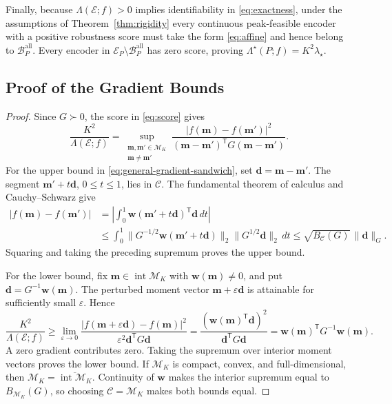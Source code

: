 \documentclass[journal,12pt,onecolumn,draftclsnofoot]{IEEEtran}
\newcommand{\enc}{\mathscr{E}}\newcommand{\dec}{\mathscr{D}}\newcommand{\R}{\mathbb R}\newcommand{\C}{\mathbb C}
\newcommand{\T}{\mathsf T}\newcommand{\suc}{\succeq}
\begin{document}
Finally, because $\Lambda(\enc;f)>0$ implies identifiability in \eqref{eq:exactness}, under the assumptions of Theorem~\ref{thm:rigidity} every continuous peak-feasible encoder with a positive robustness score must take the form \eqref{eq:affine} and hence belong to $\mathcal B_P^{\mathrm{all}}$. Every encoder in $\mathcal E_P\setminus\mathcal B_P^{\mathrm{all}}$ has zero score, proving $\Lambda^\star(P;f)=K^2\lambda_\star$.





\subsection{Proof of the Gradient Bounds}\label{app:gradient-bounds}
\begin{proof}

Since $G\succ0$, the score in \eqref{eq:score} gives
$$
\frac{K^2}{\Lambda(\enc;f)}=
\sup_{\substack{\boldsymbol m,\boldsymbol m'\in\mathcal M_K\\
                 \boldsymbol m\ne\boldsymbol m'}}
\frac{|f(\boldsymbol m)-f(\boldsymbol m')|^2}
{(\boldsymbol m-\boldsymbol m')^\T G(\boldsymbol m-\boldsymbol m')}.
$$
For the upper bound in \eqref{eq:general-gradient-sandwich}, set
$\boldsymbol d=\boldsymbol m-\boldsymbol m'$. The segment
$\boldsymbol m'+t\boldsymbol d$, $0\le t\le1$, lies in $\mathcal C$.
The fundamental theorem of calculus and Cauchy--Schwarz give
\begin{align*}
|f(\boldsymbol m)-f(\boldsymbol m')|
&=\left|\int_0^1\boldsymbol w(\boldsymbol m'+t\boldsymbol d)^\T
\boldsymbol d\,dt\right|\\
&\le\int_0^1\|G^{-1/2}\boldsymbol w(\boldsymbol m'+t\boldsymbol d)\|_2
\|G^{1/2}\boldsymbol d\|_2\,dt\le\sqrt{B_{\mathcal C}(G)}\,\|\boldsymbol d\|_G.
\end{align*}
Squaring and taking the preceding supremum proves the upper bound.

For the lower bound, fix $\boldsymbol m\in\operatorname{int}\mathcal M_K$
with $\boldsymbol w(\boldsymbol m)\ne0$, and put
$\boldsymbol d=G^{-1}\boldsymbol w(\boldsymbol m)$.
The perturbed moment vector $\boldsymbol m+\varepsilon\boldsymbol d$ is
attainable for sufficiently small $\varepsilon$. Hence
$$
\frac{K^2}{\Lambda(\enc;f)}
\ge\lim_{\varepsilon\to0}
\frac{|f(\boldsymbol m+\varepsilon\boldsymbol d)-f(\boldsymbol m)|^2}
{\varepsilon^2\boldsymbol d^\T G\boldsymbol d}
=\frac{(\boldsymbol w(\boldsymbol m)^\T\boldsymbol d)^2}
{\boldsymbol d^\T G\boldsymbol d}
=\boldsymbol w(\boldsymbol m)^\T G^{-1}\boldsymbol w(\boldsymbol m).
$$
A zero gradient contributes zero. Taking the supremum over interior
moment vectors proves the lower bound. If $\mathcal M_K$ is compact, convex,
and full-dimensional, then
$\mathcal M_K=\overline{\operatorname{int}\mathcal M_K}$.
Continuity of $\boldsymbol w$ makes the interior supremum equal to
$B_{\mathcal M_K}(G)$, so choosing $\mathcal C=\mathcal M_K$
makes both bounds equal.



\end{proof}
\end{document}

